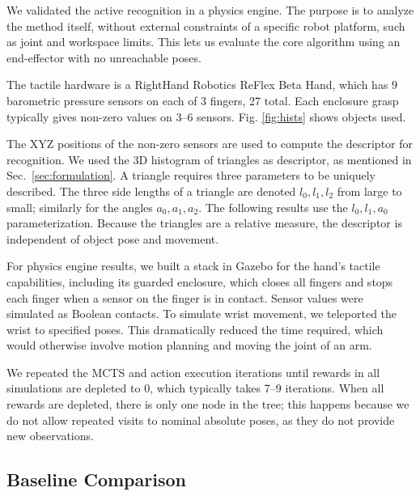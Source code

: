 \documentclass[letterpaper, 10 pt, conference]{ieeeconf}  %
\newcommand{\red}[1]{\textcolor{red}{#1}}
\begin{document}
We validated the active recognition in a physics engine. 
The purpose is to analyze the method itself, without external constraints of a specific robot platform, such as joint and workspace limits. This lets us evaluate the core algorithm using an end-effector with no unreachable poses.

The tactile hardware is a RightHand Robotics ReFlex Beta Hand, which has 9 barometric pressure sensors on each of 3 fingers, 27 total. Each enclosure grasp typically gives non-zero values on 3--6 sensors.
Fig. \ref{fig:hists} shows objects used.


The XYZ positions of the non-zero sensors are used to compute the descriptor for recognition. We used the 3D histogram of triangles \cite{triangles} as descriptor, as mentioned in Sec.~\ref{sec:formulation}. A triangle requires three parameters to be uniquely described. The three side lengths of a triangle are denoted $l_0, l_1, l_2$ from large to small; similarly for the angles $a_0, a_1, a_2$. The following results use the $l_0, l_1, a_0$ parameterization. Because the triangles are a relative measure, the descriptor is independent of object pose and movement.

For physics engine results, we built a stack in Gazebo for the hand's tactile capabilities, including its guarded enclosure, which closes all fingers and stops each finger when a sensor on the finger is in contact. Sensor values were simulated as Boolean contacts. To simulate wrist movement, we teleported the wrist to specified poses. This dramatically reduced the time required, which would otherwise involve motion planning and moving the joint of an arm.

We repeated the MCTS and action execution iterations until rewards in all simulations are depleted to 0, which typically takes 7--9 iterations. When all rewards are depleted, there is only one node in the tree; this happens because we do not allow repeated visits to nominal absolute poses, as they do not provide new observations.


\subsection{Baseline Comparison}
\end{document}
